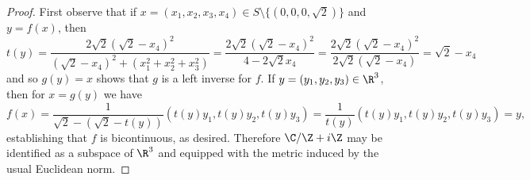 \documentclass[10pt]{amsart}
\begin{document}
\begin{thm}
\begin{proof}
		First observe that if $x = (x_1, x_2, x_3, x_4) \in S \setminus \{(0,0,0,\sqrt{2})\}$ and $y = f(x)$, then
		$$t(y) = \frac{2\sqrt{2}(\sqrt{2} - x_4)^2}{(\sqrt{2} - x_4)^2 + (x_1^2 + x_2^2 + x_3^2)} = \frac{2\sqrt{2}(\sqrt{2} - x_4)^2}{4 - 2\sqrt{2}x_4} = \frac{2\sqrt{2}(\sqrt{2} - x_4)^2}{2\sqrt{2}(\sqrt{2} -x_4)} = \sqrt{2} - x_4$$
		and so $g(y) = x$ shows that $g$ is a left inverse for $f$.
		If $y = (y_1, y_2, y_3) \in \R^3$, then for $x = g(y)$ we have
		$$f(x) = \frac{1}{\sqrt{2} - (\sqrt{2} - t(y))}(t(y)y_1, t(y)y_2, t(y)y_3) = \frac{1}{t(y)}(t(y)y_1, t(y)y_2, t(y)y_3) = y,$$
		establishing that $f$ is bicontinuous, as desired.
		Therefore $\C/\Z +i\Z$ may be identified as a subspace of $\R^3$ and equipped with the metric induced by the usual Euclidean norm.		
	\end{proof}
 \end{thm}
\end{document}
